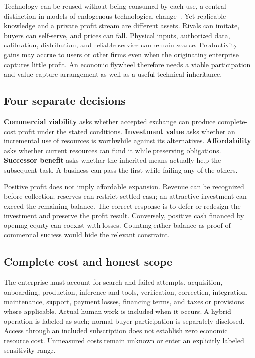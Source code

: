 \documentclass[10pt,a4paper]{article}
\begin{document}
Technology can be reused without being consumed by each use, a central distinction in models of endogenous technological change~\citep{romer}. Yet replicable knowledge and a private profit stream are different assets. Rivals can imitate, buyers can self-serve, and prices can fall. Physical inputs, authorized data, calibration, distribution, and reliable service can remain scarce. Productivity gains may accrue to users or other firms even when the originating enterprise captures little profit. An economic flywheel therefore needs a viable participation and value-capture arrangement as well as a useful technical inheritance.

\subsection{Four separate decisions}

\textbf{Commercial viability} asks whether accepted exchange can produce complete-cost profit under the stated conditions. \textbf{Investment value} asks whether an incremental use of resources is worthwhile against its alternatives. \textbf{Affordability} asks whether current resources can fund it while preserving obligations. \textbf{Successor benefit} asks whether the inherited means actually help the subsequent task. A business can pass the first while failing any of the others.

Positive profit does not imply affordable expansion. Revenue can be recognized before collection; reserves can restrict settled cash; an attractive investment can exceed the remaining balance. The correct response is to defer or redesign the investment and preserve the profit result. Conversely, positive cash financed by opening equity can coexist with losses. Counting either balance as proof of commercial success would hide the relevant constraint.

\subsection{Complete cost and honest scope}

The enterprise must account for search and failed attempts, acquisition, onboarding, production, inference and tools, verification, correction, integration, maintenance, support, payment losses, financing terms, and taxes or provisions where applicable. Actual human work is included when it occurs. A hybrid operation is labeled as such; normal buyer participation is separately disclosed. Access through an included subscription does not establish zero economic resource cost. Unmeasured costs remain unknown or enter an explicitly labeled sensitivity range.
\end{document}

